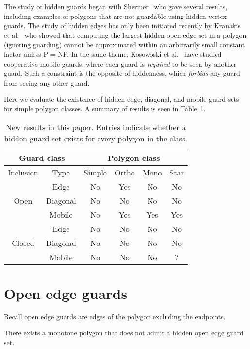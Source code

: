 \documentclass{cccg12}
\begin{document}
The study of hidden guards began with Shermer~\cite{Shermer-1989} who gave several results, including examples of polygons that are not guardable using hidden vertex guards.
The study of hidden edges has only been initiated recently by Kranakis et al.~\cite{Kranakis-2009} who showed that computing the largest hidden open edge set in a polygon (ignoring guarding) cannot be approximated within an arbitrarily small constant factor unless P = NP. 
In the same theme, Kosowoski et al.~\cite{Kosowski-2006} have studied cooperative mobile guards, where each guard is \emph{required} to be seen by another guard.
Such a constraint is the opposite of hiddenness, which \emph{forbids} any guard from seeing any other guard. 

Here we evaluate the existence of hidden edge, diagonal, and mobile guard sets for simple polygon classes.
A summary of results is seen in Table~\ref{tab:results}.

\begin{table}[ht]
\centering
\begin{tabular}{|c|c|c|c|c|c|}
\hline 
\multicolumn{2}{|c|}{Guard class} & \multicolumn{4}{|c|}{Polygon class} \\
\hline
Inclusion & Type & Simple & Ortho & Mono & Star \\
\hline
     & Edge & No & Yes & No & No \\
\cline{2-6}
Open & Diagonal & No & No & No & No \\
\cline{2-6}
     & Mobile & No & Yes & Yes & Yes \\
\hline
     & Edge & No & No & No & No \\
\cline{2-6}
Closed & Diagonal & No & No & No & No \\
\cline{2-6}
     & Mobile & No & No & No & ? \\
\hline
\end{tabular}
\caption{New results in this paper. Entries indicate whether a hidden guard set exists for every polygon in the class.}
\label{tab:results}
\end{table}

\section{Open edge guards}

Recall open edge guards are edges of the polygon excluding the endpoints.

\begin{lemma}
There exists a monotone polygon that does not admit a hidden open edge guard set.
\end{lemma}
\end{document}
